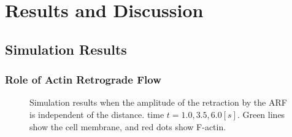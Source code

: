 \documentclass[a4paper,12pt, oneside]{book}
\begin{document}
\chapter{Results and Discussion}
\section{Simulation Results}
\subsection{Role of Actin Retrograde Flow}
\begin{figure}[tbp]
 \caption{Simulation results when the amplitude of the retraction by the ARF is independent of the distance. time $t = 1.0, 3.5, 6.0 [s]$. Green lines show the cell membrane, and red dots show F-actin.}
 \label{fig:res0}
\end{figure}
\end{document}
